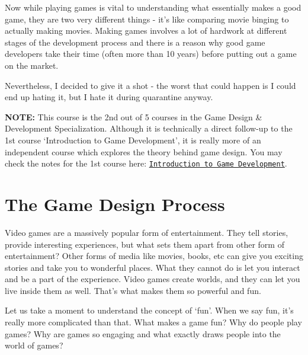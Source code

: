 \documentclass{article}[a4paper,12pt]
\theoremstyle{definition}
\begin{document}
Now while playing games is vital to understanding what essentially makes a good game, they are two very different things - it's like comparing movie binging to actually making movies. Making games involves a lot of hardwork at different stages of the development process and there is a reason why good game developers take their time (often more than 10 years) before putting out a game on the market.
\vspace{6pt}

Nevertheless, I decided to give it a shot - the worst that could happen is I could end up hating it, but I hate it during quarantine anyway.

\hrulefill
\vspace{6pt}

\textbf{NOTE:} This course is the 2nd out of 5 courses in the Game Design \& Development Specialization. Although it is technically a direct follow-up to the 1st course `Introduction to Game Development', it is really more of an independent course which explores the theory behind game design. You may check the notes for the 1st course here: \texttt{\href{https://omprabhu31.github.io/gamedev/notes/gamedev_intro/intro_to_gamedev.pdf}{Introduction to Game Development}}.

\hrulefill
\pagebreak
\section{The Game Design Process}
Video games are a massively popular form of entertainment. They tell stories, provide interesting experiences, but what sets them apart from other form of entertainment? Other forms of media like movies, books, etc can give you exciting stories and take you to wonderful places. What they cannot do is let you interact and be a part of the experience. Video games create worlds, and they can let you live inside them as well. That's what makes them so powerful and fun.
\vspace{6pt}

Let us take a moment to understand the concept of `fun'. When we say fun, it's really more complicated than that. What makes a game fun? Why do people play games? Why are games so engaging and what exactly draws people into the world of games?

\hrulefill 
\end{document}
